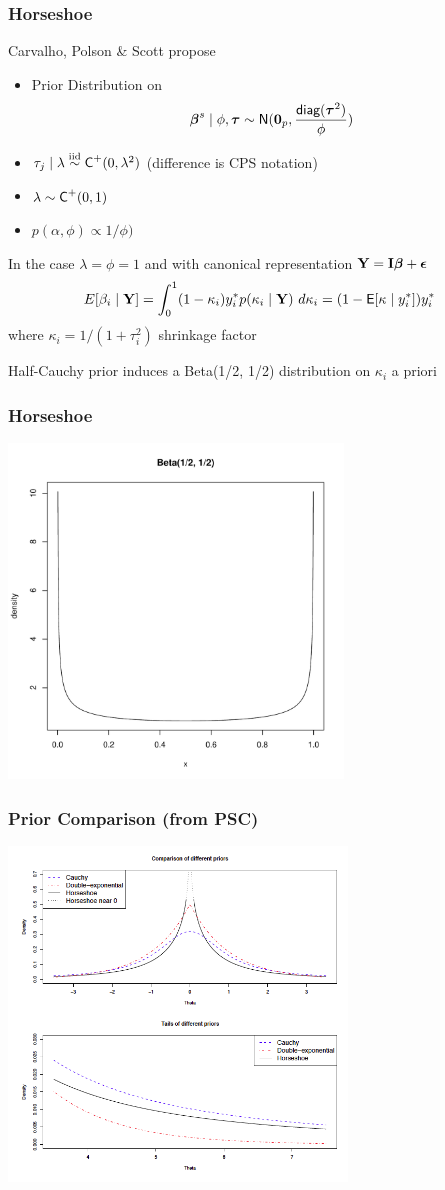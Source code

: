 \documentclass[]{beamer}
\begin{document}
\begin{frame}
  \frametitle{Horseshoe}
  Carvalho, Polson \& Scott  propose
\begin{itemize}
\item 
Prior Distribution on $$\boldsymbol{\beta}^s \mid \phi, \boldsymbol{\tau} \sim \textsf{N}(\mathbf{0}_p, \frac{\textsf{diag}(\boldsymbol{\tau}^2)}{ \phi
    }) $$ \pause
\item $\tau_j \mid \lambda \mathrel{\mathop{\sim}\limits^{\rm iid}} \textsf{C}^+(0, \lambda^2)$   (difference is CPS notation) \pause
\item $\lambda \sim \textsf{C}^+(0, 1)$ \pause
\item $p(\alpha, \phi) \propto 1/\phi)$ \pause
\end{itemize}

In the case $\lambda = \phi = 1$ and with canonical representation $\mathbf{Y} =
\mathbf{I} \boldsymbol{\beta} + \boldsymbol{\epsilon}$ \pause
$$ 
E[\beta_i \mid \mathbf{Y}] = \int_0^1 (1 - \kappa_i) y^*_i p(\kappa_i \mid \mathbf{Y})
\ d\kappa_i = (1 - \textsf{E}[\kappa \mid y^*_i]) y^*_i$$
where $\kappa_i = 1/(1 + \tau_i^2)$ shrinkage factor \pause

\vspace{18pt}
Half-Cauchy prior induces a Beta(1/2, 1/2) distribution on $\kappa_i$
a priori
\end{frame}
\begin{frame}
\frametitle{Horseshoe}
  \includegraphics[height=3.5in]{beta}
\end{frame}

\begin{frame}
\frametitle{Prior Comparison (from PSC)}
  \includegraphics[height=3.5in]{densities}
\end{frame}
\end{document}

